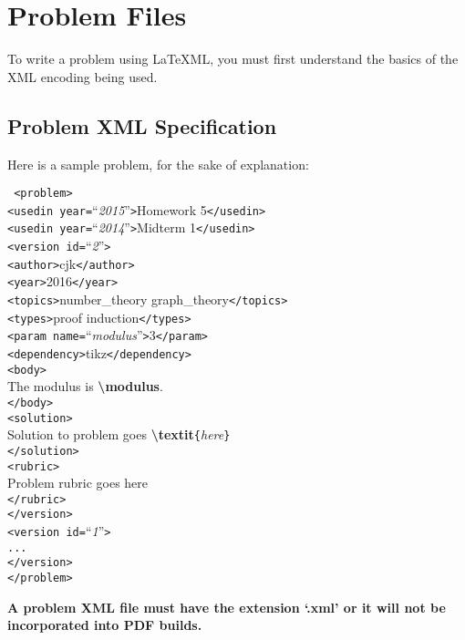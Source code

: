 \section{Problem Files}
  To write a problem using \LaTeX ML, you must first understand the basics 
  of the XML encoding being used.
  
  \subsection{Problem XML Specification}
    Here is a sample problem, for the sake of explanation:
{
  \newcommand\TB{\hspace*{1em}}
    \begin{mdframed}
      \texttt{
<problem>\\
\TB<usedin year=}``\textit{2015}''\texttt{>}Homework 5\texttt{</usedin>\\
\TB<usedin year=}``\textit{2014}''\texttt{>}Midterm 1\texttt{</usedin>\\
\TB<version id=}``\textit{2}''\texttt{>\\
\TB\TB<author>}cjk\texttt{</author>\\
\TB\TB<year>}2016\texttt{</year>\\
\TB\TB<topics>}number\_theory graph\_theory\texttt{</topics>\\
\TB\TB<types>}proof induction\texttt{</types>\\
\TB\TB<param name=}``\textit{modulus}''\texttt{>}3\texttt{</param>\\
\TB\TB<dependency>}tikz\texttt{</dependency>\\
\TB\TB<body>}\\
\TB\TB\TB The modulus is \textbf{\textbackslash modulus}.\\
\TB\TB\texttt{</body>\\
\TB\TB<solution>}\\
\TB\TB\TB Solution to problem goes 
  \textbf{\textbackslash textit}\texttt{\{}\textit{here}\texttt{\}}\\
\TB\TB\texttt{</solution>\\
\TB\TB<rubric>\\
\TB\TB\TB}Problem rubric goes here\texttt{\\
\TB\TB</rubric>\\
\TB</version>\\
\TB<version id=}``\textit{1}''\texttt{>\\
\TB\TB...\\
\TB</version>\\
</problem>
}
    \end{mdframed}
}
    \textbf{A problem XML file must have the extension `.xml' or it will 
    not be incorporated into PDF builds.}
    
